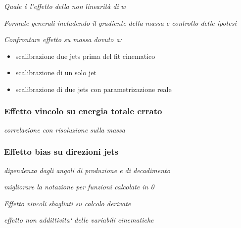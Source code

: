 {\em Quale \`e l'effetto della non linearit\`a di $w$}

{\em Formule generali includendo il gradiente della massa e controllo delle ipotesi}

{\em Confrontare effetto su massa dovuto a:
\begin{itemize}
\item scalibrazione due jets prima del fit cinematico
\item scalibrazione di un solo jet
\item scalibrazione di due jets con parametrizazione reale
\end{itemize}}
\subsubsection{Effetto vincolo su energia totale errato}
{\em correlazione con risoluzione sulla massa}
\subsubsection{Effetto bias su direzioni jets}

{\em dipendenza dagli angoli di produzione e di decadimento}

{\em migliorare la notazione per funzioni calcolate in 0}

{\em Effetto vincoli sbagliati su calcolo derivate}

{\em effetto non addittivita` delle variabili cinematiche}

%